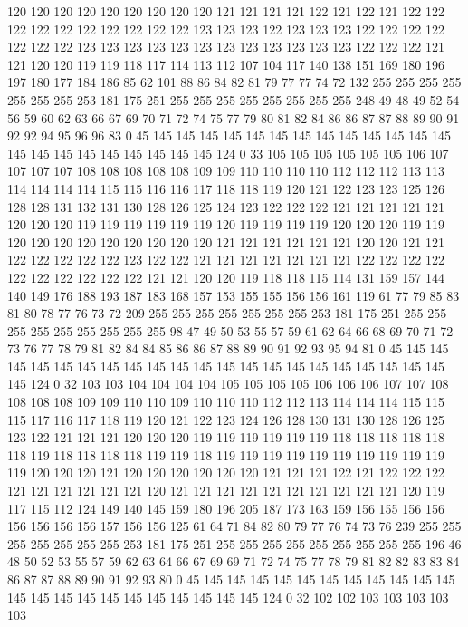 120 120 120 120 120 120 120 120 120 121 121 121 121 122 121 122 121 122 122 122
122 122 122 122 122 122 122 123 123 123 122 123 123 123 122 122 122 122 122 122
122 123 123 123 123 123 123 123 123 123 123 123 123 122 122 122 121 121 120 120
119 119 118 117 114 113 112 107 104 117 140 138 151 169 180 196 197 180 177 184
186 85 62 101 88 86 84 82 81 79 77 77 74 72 132 255 255 255 255 255
255 255 253 181 175 251 255 255 255 255 255 255 255 255 248 49 48 49 52 54
56 59 60 62 63 66 67 69 70 71 72 74 75 77 79 80 81 82 84 86
86 87 87 88 89 90 91 92 92 94 95 96 96 83 0 45 145 145 145 145
145 145 145 145 145 145 145 145 145 145 145 145 145 145 145 145 145 145 124 0
33 105 105 105 105 105 105 106 107 107 107 107 108 108 108 108 108 109 109 110
110 110 110 112 112 112 113 113 114 114 114 114 115 115 116 116 117 118 118 119
120 121 122 123 123 125 126 128 128 131 132 131 130 128 126 125 124 123 122 122
122 121 121 121 121 121 120 120 120 119 119 119 119 119 119 120 119 119 119 119
120 120 120 119 119 120 120 120 120 120 120 120 120 120 121 121 121 121 121 121
120 120 121 121 122 122 122 122 122 123 122 122 121 121 121 121 121 121 121 122
122 122 122 122 122 122 122 122 122 121 121 120 120 119 118 118 115 114 131 159
157 144 140 149 176 188 193 187 183 168 157 153 155 155 156 156 161 119 61 77
79 85 83 81 80 78 77 76 73 72 209 255 255 255 255 255 255 255 253 181
175 251 255 255 255 255 255 255 255 255 255 98 47 49 50 53 55 57 59 61
62 64 66 68 69 70 71 72 73 76 77 78 79 81 82 84 84 85 86 86
87 88 89 90 91 92 93 95 94 81 0 45 145 145 145 145 145 145 145 145
145 145 145 145 145 145 145 145 145 145 145 145 145 145 124 0 32 103 103 104
104 104 104 105 105 105 105 106 106 106 107 107 108 108 108 108 109 109 110 110
109 110 110 110 112 112 113 114 114 114 115 115 115 117 116 117 118 119 120 121
122 123 124 126 128 130 131 130 128 126 125 123 122 121 121 121 120 120 120 119
119 119 119 119 119 118 118 118 118 118 118 119 118 118 118 118 119 119 118 119
119 119 119 119 119 119 119 119 119 119 120 120 120 121 120 120 120 120 120 120
121 121 121 122 121 122 122 122 121 121 121 121 121 121 120 121 121 121 121 121
121 121 121 121 121 120 119 117 115 112 124 149 140 145 159 180 196 205 187 173
163 159 156 155 156 156 156 156 156 156 157 156 156 125 61 64 71 84 82 80
79 77 76 74 73 76 239 255 255 255 255 255 255 255 253 181 175 251 255 255
255 255 255 255 255 255 255 196 46 48 50 52 53 55 57 59 62 63 64 66
67 69 69 71 72 74 75 77 78 79 81 82 82 83 83 84 86 87 87 88
89 90 91 92 93 80 0 45 145 145 145 145 145 145 145 145 145 145 145 145
145 145 145 145 145 145 145 145 145 145 124 0 32 102 102 103 103 103 103 103
